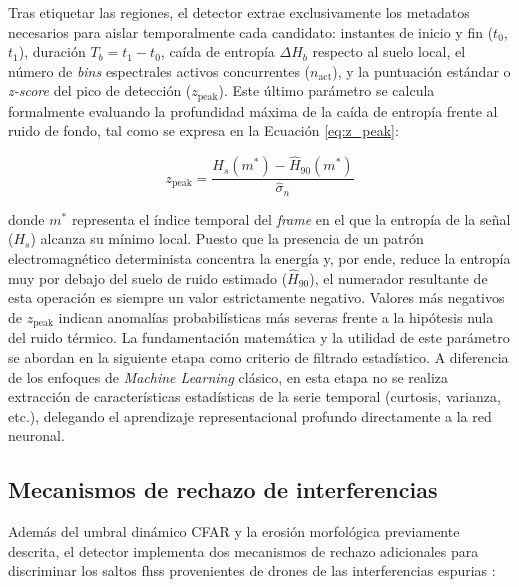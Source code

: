 Tras etiquetar las regiones, el detector extrae exclusivamente los metadatos necesarios para aislar temporalmente cada candidato: instantes de inicio y fin ($t_0$, $t_1$), duración $T_b = t_1 - t_0$, caída de entropía $\Delta H_b$ respecto al suelo local, el número de \textit{bins} espectrales activos concurrentes ($n_{\text{act}}$), y la puntuación estándar o \textit{z-score} del pico de detección ($z_{\text{peak}}$). Este último parámetro se calcula formalmente evaluando la profundidad máxima de la caída de entropía frente al ruido de fondo, tal como se expresa en la Ecuación \ref{eq:z_peak}:

\begin{equation}
    z_{\text{peak}} = \frac{H_s(m^*) - \widehat{H}_{90}(m^*)}{\hat{\sigma}_n}
    \label{eq:z_peak}
\end{equation}

donde $m^*$ representa el índice temporal del \textit{frame} en el que la entropía de la señal ($H_s$) alcanza su mínimo local. Puesto que la presencia de un patrón electromagnético determinista concentra la energía y, por ende, reduce la entropía muy por debajo del suelo de ruido estimado ($\widehat{H}_{90}$), el numerador resultante de esta operación es siempre un valor estrictamente negativo. Valores más negativos de $z_{\text{peak}}$ indican anomalías probabilísticas más severas frente a la hipótesis nula del ruido térmico. La fundamentación matemática y la utilidad de este parámetro se abordan en la siguiente etapa como criterio de filtrado estadístico. A diferencia de los enfoques de \textit{Machine Learning} clásico, en esta etapa no se realiza extracción de características estadísticas de la serie temporal (curtosis, varianza, etc.), delegando el aprendizaje representacional profundo directamente a la red neuronal.

\subsection{Mecanismos de rechazo de interferencias}
\label{subsec:filtros_rechazo}

Además del umbral dinámico CFAR y la erosión morfológica previamente descrita, el detector implementa dos mecanismos de rechazo adicionales para discriminar los saltos \gls{fhss} provenientes de drones de las interferencias espurias \cite{ezuma_detection_2020}:

